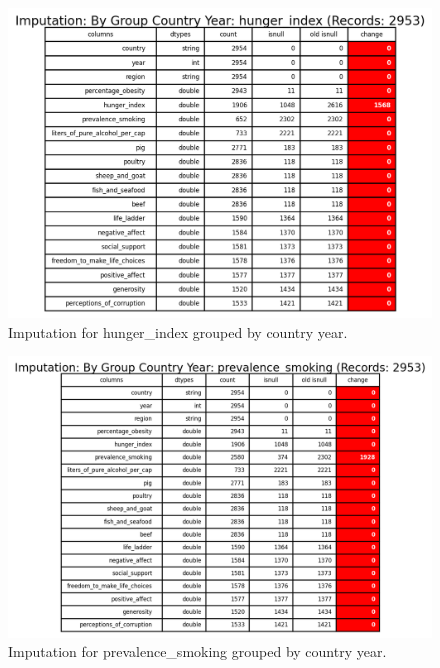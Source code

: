                 \begin{figure}[H]
                        \centering
                        \includegraphics[scale=1]{images/dp_imputation_c_y_hunger_index}
                        \caption{Imputation for hunger\_index grouped by country year.}
                        \label{fig:dp-impute-group-country-hunger-index}
                \end{figure}

                \begin{figure}[H]
                        \centering
                        \includegraphics[scale=1]{images/dp_imputation_c_y_prevalence_smoking}
                        \caption{Imputation for prevalence\_smoking grouped by country year.}
                        \label{fig:dp-impute-group-country-prevalence-smoking}
                \end{figure}

